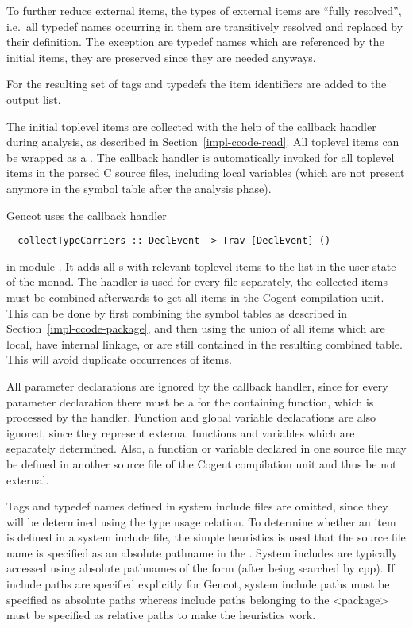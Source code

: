 To further reduce external items, the types of external items are ``fully resolved'', i.e.~all
typedef names occurring in them are transitively resolved and replaced by their definition. The exception are
typedef names which are referenced by the initial items, they are preserved since they are needed anyways.

For the resulting set of tags and typedefs the item identifiers are added to the output list. 

The initial toplevel items are collected with the help of the callback handler during analysis, as described in 
Section~\ref{impl-ccode-read}. All toplevel items can be wrapped as a . The callback handler 
is automatically invoked for all toplevel items in the parsed
C source files, including local variables (which are not present anymore in the symbol table after the analysis phase).

Gencot uses the callback handler
\begin{verbatim}
  collectTypeCarriers :: DeclEvent -> Trav [DeclEvent] ()
\end{verbatim}
in module . It adds all s with relevant toplevel items to the list in the 
user state of the  monad. The handler is used for every  file separately, the collected
items must be combined afterwards to get all items in the Cogent compilation unit. This can be
done by first combining the symbol tables as described in Section~\ref{impl-ccode-package}, and then using the union of all 
items which are local, have internal linkage, or are still contained in the resulting combined table. 
This will avoid duplicate occurrences of items.

All parameter declarations are ignored by the callback handler, since for every parameter declaration there must be 
a  for the containing function, which is processed by the handler. Function and global variable declarations 
are also ignored, since they represent external functions and variables which are separately determined. Also,
a function or variable declared in one source file may be defined in another source file of the Cogent compilation unit and thus 
be not external. 

Tags and typedef names defined in system include files are omitted, since they will be determined 
using the type usage relation. To determine whether
an item is defined in a system include file, the simple heuristics is used that the source file name is specified
as an absolute pathname in the . System includes are typically accessed using absolute pathnames of the 
form  (after being searched by cpp). If include paths are specified explicitly for Gencot, 
system include paths must be 
specified as absolute paths whereas include paths belonging to the <package> must be specified as relative paths
to make the heuristics work.

